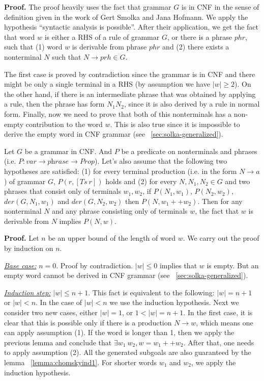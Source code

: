 \textbf{Proof.}
The proof heavily uses the fact that grammar $G$ is in CNF in the sense of definition given in the work of Gert Smolka and Jana Hofmann.
We apply the hypothesis ``syntactic analysis is possible''. After their application, we get the fact that word $w$ is either a RHS of a rule of grammar $G$, or there is a phrase $phr$, such that (1) word $w$ is derivable from phrase $phr$ and (2) there exists a nonterminal $N$ such that $N \to prh \in G$.

The first case is proved by contradiction since the grammar is in CNF and there might be only a single terminal in a RHS (by assumption we have $|w| \ge 2$).
On the other hand, if there is an intermediate phrase that was obtained by applying a rule, then the phrase has form $N_1 N_2$, since it is also derived by a rule in normal form.
Finally, now we need to prove that both of this nonterminals has a non-empty contribution to the word $w$. This is also true since it is impossible to derive the empty word in CNF grammar (see ~\ref{sec:solka-generalized}).

\begin{lemma}
	Let $G$ be a grammar in CNF. And $P$ be a predicate on nonterminals and phrases (i.e. $P: var \to \textit{phrase} \to \textit{Prop}$).
	Let's also assume that the following two hypotheses are satisfied:
	(1) for every terminal production (i.e. in the form $N \to a$) of grammar $G$, $P(r, [Ts \ r])$ holds and (2) for every $N, N_1, N_2 \in G$ and two phrases that consist only of terminals $w_1, w_2$, if $P(N_1, w_1)$, $P(N_2, w_2)$, $der(G, N_1, w_1)$ and $der(G, N_2, w_2)$ then $P(N, w_1 ++ w_2)$.
	Then for any nonterminal $N$ and any phrase consisting only of terminals $w$, the fact that $w$ is derivable from $N$ implies $P(N,w)$.
\end{lemma}

\textbf{Proof.} 
Let $n$ be an upper bound of the length of word $w$. We carry out the proof by induction on $n$.

\underline{\textit{Base case:}} $ n = 0 $. Proof by contradiction. $|w| \le 0$ implies that $w$ is empty. But an empty word cannot be derived in CNF grammar (see ~\ref{sec:solka-generalized}).

\underline{\textit{Induction step:}} $|w| \le n+1$. This fact is equivalent to the following:  $|w| = n+1$ or $|w| < n$. 
In the case of $|w| < n$ we use the induction hypothesis.
Next we consider two new cases, either $|w| = 1 $, or $1 < |w| = n + 1$.
In the first case, it is clear that this is possible only if there is a production $N \to w$, which means one can apply assumption (1).
If the word is longer than 1, then we apply the previous lemma and conclude that $\exists w_1 \ w_2, w = w_1 ++ w_2$. After that,
one needs to apply assumption (2). All the generated subgoals are also guaranteed by the lemma ~\ref{lemma:chomskyind1}. 
For shorter words $w_1$ and $w_2$, we apply the induction hypothesis.

